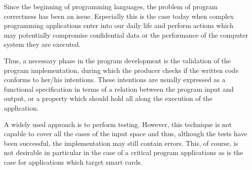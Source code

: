 Since the beginning of programming languages, the problem of program correctness has been an issue. 
Especially this is the case today when complex programming applications  enter into our daily life and perform actions 
which may potentially compromise confidential data or the performance of the computer system they are executed.



Thus, a necessary phase in the program development is the validation of the program implementation, during which 
the producer checks if the written code conforms to her/his intentions. 
These intentions are usually expressed as  a functional specification in terms of a relation between the program
input and output, or a property which  should hold all along the execution of the application. 

A widely used approach is to perform testing. However, this technique is not capable
to cover all the cases of the input space and thus, although the tests have been successful, 
the implementation may still contain errors. This, of course, is not desirable in particular in the case of a critical 
program applications as is the case for applications which target smart cards. 

